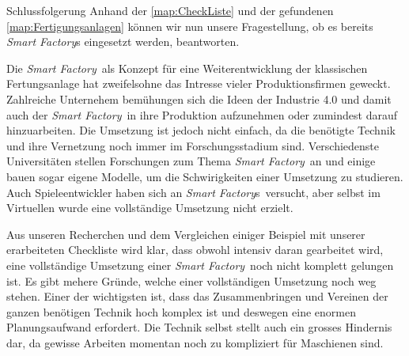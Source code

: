 \documentclass{article}
\def\SmartFactory{\textcolor{DarkestGray}{\textit{Smart Factory}}}
\begin{document}
\begin{Map}{Schlussfolgerung}
Anhand der \ref{map:CheckListe} und der gefundenen \ref{map:Fertigungsanlagen} können wir nun unsere Fragestellung, ob es bereits \SmartFactory s eingesetzt werden, beantworten. \par

Die \SmartFactory\ als Konzept für eine Weiterentwicklung der klassischen Fertungsanlage hat zweifelsohne das Intresse vieler Produktionsfirmen geweckt. Zahlreiche Unternehem bemühungen sich die Ideen der Industrie 4.0 und damit auch der \SmartFactory\ in ihre Produktion aufzunehmen oder zumindest darauf hinzuarbeiten. Die Umsetzung ist jedoch nicht einfach, da die benötigte Technik und ihre Vernetzung noch immer im Forschungsstadium sind. Verschiedenste Universitäten stellen Forschungen zum Thema \SmartFactory\ an und einige bauen sogar eigene Modelle, um die Schwirigkeiten einer Umsetzung zu studieren. Auch Spieleentwickler haben sich an \SmartFactory s\ versucht, aber selbst im Virtuellen wurde eine vollständige Umsetzung nicht erzielt. 

Aus unseren Recherchen und dem Vergleichen einiger Beispiel mit unserer erarbeiteten Checkliste wird klar, dass obwohl intensiv daran gearbeitet wird, eine vollständige Umsetzung einer \SmartFactory\ noch nicht komplett gelungen ist. Es gibt mehere Gründe, welche einer vollständigen Umsetzung noch weg stehen. Einer der wichtigsten ist, dass das Zusammenbringen und Vereinen der ganzen benötigen Technik hoch komplex ist und deswegen eine enormen Planungsaufwand erfordert. Die Technik selbst stellt auch ein grosses Hindernis dar, da gewisse Arbeiten momentan noch zu kompliziert für Maschienen sind. 
\end{Map}
\end{document}
